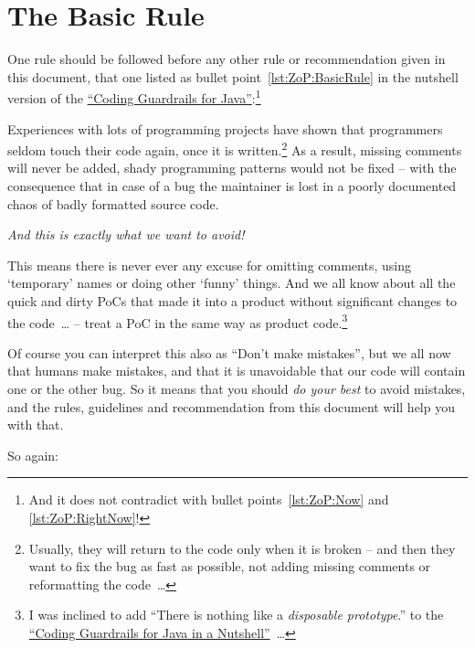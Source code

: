 \documentclass[11pt,a4paper, titlepage, parskip=half, headsepline, footsepline, cleardoublepage=current, headheight=1cm]{scrbook}
\newcommand*{\ngref}{\hyperref[lst:NutshellGuardrails]{“Coding Guardrails for Java in a Nutshell”}}
\begin{document}
\section{The Basic Rule}\label{sec:TheBasicRule}
One rule should be followed before any other rule or recommendation given in this document, that one listed as bullet point~\ref{lst:ZoP:BasicRule} in the nutshell version of the \hyperref[lst:NutshellGuardrails]{“Coding Guardrails for Java”}:\footnote{And it does not contradict with bullet points~\ref{lst:ZoP:Now} and \ref{lst:ZoP:RightNow}!}

\begin{center}
	\begin{huge}
	\end{huge}
\end{center}

Experiences with lots of programming projects have shown that programmers seldom touch their code again, once it is written.\footnote{Usually, they will return to the code only when it is broken – and then they want to fix the bug as fast as possible, not adding missing comments or reformatting the code~…} As a result, missing comments will never be added, shady programming patterns would not be fixed – with the consequence that in case of a bug the maintainer is lost in a poorly documented chaos of badly formatted source code.

\textit{And this is exactly what we want to avoid!} 

This means there is never ever any excuse for omitting comments, using ‘temporary’ names or doing other ‘funny’ things. And we all know about all the quick and dirty PoCs that made it into a product without significant changes to the code~… – treat a PoC in the same way as product code.\footnote{I was inclined to add “There is nothing like a \textit{disposable prototype}.” to the \ngref~…}

Of course you can interpret this also as “Don't make mistakes”, but we all now that humans make mistakes, and that it is unavoidable that our code will contain one or the other bug. So it means that you should \textit{do your best} to avoid mistakes, and the rules, guidelines and recommendation from this document will help you with that.

So again:

\begin{center}
	\begin{huge}
		\fbox{\textbf{Always do it right in the first place!}}
	\end{huge}
\end{center}
\end{document}

